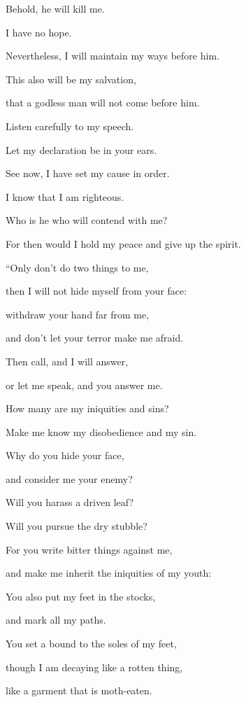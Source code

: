 {\par }{\Q {}Behold, he will kill me.
\par }{\QB I have no hope.
\par }{\QB Nevertheless, I will maintain my ways before him.
\par }{\Q {}This also will be my salvation,
\par }{\QB that a godless man will not come before him.
\par }{\Q {}Listen carefully to my speech.
\par }{\QB Let my declaration be in your ears.
\par }{\Q {}See now, I have set my cause in order.
\par }{\QB I know that I am righteous.
\par }{\Q {}Who is he who will contend with me?
\par }{\QB For then would I hold my peace and give up the spirit.
\par }{\BB \par }{\Q {}“Only don’t do two things to me,
\par }{\QB then I will not hide myself from your face:
\par }{\Q {}withdraw your hand far from me,
\par }{\QB and don’t let your terror make me afraid.
\par }{\Q {}Then call, and I will answer,
\par }{\QB or let me speak, and you answer me.
\par }{\Q {}How many are my iniquities and sins?
\par }{\QB Make me know my disobedience and my sin.
\par }{\Q {}Why do you hide your face,
\par }{\QB and consider me your enemy?
\par }{\Q {}Will you harass a driven leaf?
\par }{\QB Will you pursue the dry stubble?
\par }{\Q {}For you write bitter things against me,
\par }{\QB and make me inherit the iniquities of my youth:
\par }{\Q {}You also put my feet in the stocks,
\par }{\QB and mark all my paths.
\par }{\QB You set a bound to the soles of my feet,
\par }{\Q {}though I am decaying like a rotten thing,
\par }{\QB like a garment that is moth-eaten.
\par }{\BB \par }
